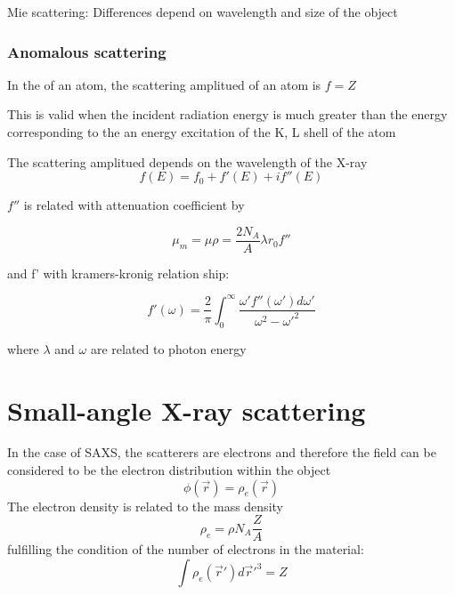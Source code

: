 Mie scattering: Differences depend on wavelength and size of the object

\subsubsection{Anomalous scattering}

In the of an atom, the scattering amplitued of an atom is $f=Z$

This is valid when the incident radiation energy is much greater than the energy corresponding to the an energy excitation of the K, L shell of the atom

The scattering amplitued depends on the wavelength of the X-ray
\begin{equation}
        f(E) = f_0 + f'(E) + i f'' (E)
\end{equation}

$f''$ is related with attenuation coefficient by

\begin{equation}
        \mu_m=\mu \rho = \frac{2 N_A}{A} \lambda r_0 f''
\end{equation}

and f' with kramers-kronig relation ship:

\begin{equation}
        f'(\omega) = \frac{2}{\pi} \int_0^{\infty} \frac{\omega'f''(\omega')d\omega'}{\omega^2-\omega'^2}
\end{equation}

where $\lambda$ and $\omega$ are related to  photon energy


\section{Small-angle X-ray scattering}

In the case of SAXS, the scatterers are electrons and therefore the field can be considered to be the electron distribution within the object
\begin{equation}
       \phi(\vec{r})=\rho_e(\vec{r})
\end{equation}
The electron density is related to the mass density
\begin{equation}
        \rho_e = \rho N_A \frac{Z}{A}
\end{equation}
fulfilling the condition of the number of electrons in the material:
\begin{equation}
        \int \rho_e(\vec{r}')  d\vec{r}'^3 = Z
\end{equation}

